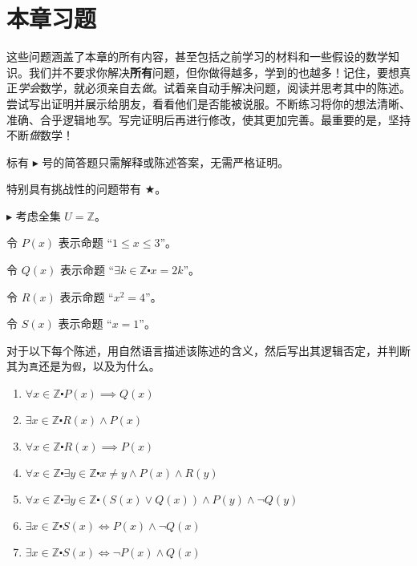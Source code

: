 \section{本章习题}

这些问题涵盖了本章的所有内容，甚至包括之前学习的材料和一些假设的数学知识。我们并不要求你解决\textbf{所有}问题，但你做得越多，学到的也越多！记住，要想真正\emph{学会}数学，就必须亲自去\emph{做}。试着亲自动手解决问题，阅读并思考其中的陈述。尝试写出证明并展示给朋友，看看他们是否能被说服。不断练习将你的想法清晰、准确、合乎逻辑地\emph{写}。写完证明后再进行修改，使其更加完善。最重要的是，坚持不断\emph{做}数学！

标有 $\blacktriangleright$ 号的简答题只需解释或陈述答案，无需严格证明。

特别具有挑战性的问题带有 $\bigstar$。

\begin{exercise}
    $\blacktriangleright$ 考虑全集 $U=\mathbb{Z}$。

    令 $P(x)$ 表示命题 ``$1 \le x \le 3$''。

    令 $Q(x)$ 表示命题 ``$\exists k \in \mathbb{Z} \centerdot x=2k$''。

    令 $R(x)$ 表示命题 ``$x^2=4$''。

    令 $S(x)$ 表示命题 ``$x=1$''。

    对于以下每个陈述，用自然语言描述该陈述的含义，然后写出其逻辑否定，并判断其为\verb|真|还是为\verb|假|，以及为什么。

    \begin{enumerate}[label=(\alph*)]
        \item $\forall x \in \mathbb{Z} \centerdot P(x) \implies Q(x)$
        \item $\exists x \in \mathbb{Z} \centerdot R(x) \land P(x)$
        \item $\forall x \in \mathbb{Z} \centerdot R(x) \implies P(x)$
        \item $\forall x \in \mathbb{Z} \centerdot \exists y \in \mathbb{Z} \centerdot x \ne y \land P(x) \land R(y)$
        \item $\forall x \in \mathbb{Z} \centerdot \exists y \in \mathbb{Z} \centerdot (S(x) \lor Q(x)) \land P(y) \land \neg Q(y)$
        \item $\exists x \in \mathbb{Z} \centerdot S(x) \iff P(x) \land \neg Q(x)$
        \item $\exists x \in \mathbb{Z} \centerdot S(x) \iff \neg P(x) \land Q(x)$
    \end{enumerate}
\end{exercise}

